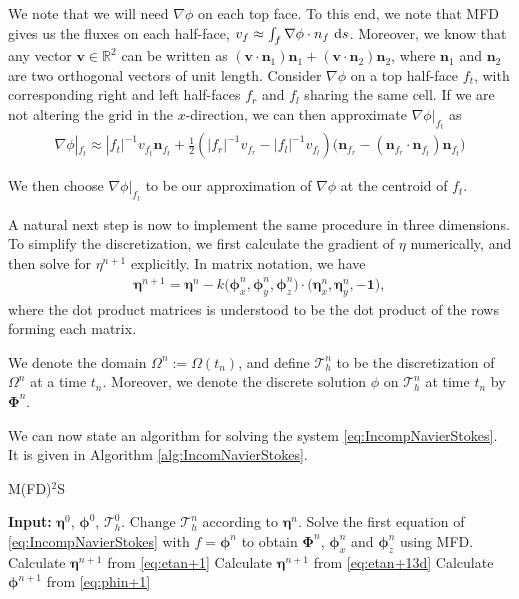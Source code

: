 \documentclass[11pt]{article}
\begin{document}
We note that we will need $\nabla \phi$ on each top face. To this end, we note that MFD gives us the fluxes on each half-face, $v_{f} \approx \int_{f} \nabla \phi \cdot n_{f} \, \operatorname{d}\! s$.
Moreover, we know that any vector $\bm{v} \in \mathbb{R}^2$ can be written as $(\bm{v}\cdot\bm{n}_1) \bm{n}_1 + (\bm{v}\cdot\bm{n}_2) \bm{n}_2$,
where $\bm{n}_1$ and $\bm{n}_2$ are two orthogonal vectors of unit length.
Consider $\nabla \phi$ on a top half-face $f_t$, with corresponding right and left half-faces $f_r$ and $f_l$ sharing the same cell.
If we are not altering the grid in the $x$-direction, we can then approximate $\nabla \phi|_{f_t}$ as
\begin{align*}
    \nabla \phi|_{f_t} \approx |f_t|^{-1} v_{f_t} \bm{n}_{f_t} + \frac{1}{2}(|f_r|^{-1}v_{f_r}-|f_l|^{-1}v_{f_l})\big(\bm{n}_{f_r} - (\bm{n}_{f_r} \cdot \bm{n}_{f_t})\bm{n}_{f_t}\big)
\end{align*}

We then choose $\nabla \phi|_{f_t}$ to be our approximation of $\nabla \phi$ at the centroid of $f_t$.

A natural next step is now to implement the same procedure in three dimensions. To simplify the discretization, we first calculate
the gradient of $\eta$ numerically, and then solve for $\eta^{n+1}$ explicitly. In matrix notation, we have
\begin{align}
    \label{eq:etan+13d}
    \bm{\eta}^{n+1} = \bm{\eta}^n - k \big(\bm{\phi}_x^n, \bm{\phi}_y^n, \bm{\phi}_z^n\big)\cdot(\bm{\eta}_x^n, \bm{\eta}_y^n, -\bm{1}\big),
\end{align}
where the dot product matrices is understood to be the dot product of the rows forming each matrix.

We denote the domain $\Omega^n := \Omega(t_n)$, and define $\mathcal{T}_h^n$ to be the discretization of $\Omega^n$
at a time $t_n$. Moreover, we denote the discrete solution $\phi$ on $\mathcal{T}_h^n$ at time $t_n$ by $\bm{\Phi}^n$.

We can now state an algorithm for solving the system \eqref{eq:IncompNavierStokes}. It is given in Algorithm \eqref{alg:IncomNavierStokes}.
%
%
\begin{algorithm}
    \caption{M(FD)$^2$S}
    \begin{algorithmic}[1]
    \State    \textbf{Input:} $\bm{\eta}^0$, $\bm{\phi}^0$, $\mathcal{T}_h^0$.
	    \State    Change $\mathcal{T}_h^n$ according to $\bm{\eta}^n$.
            \State    Solve the first equation of \eqref{eq:IncompNavierStokes} with $f = \bm{\phi}^n$ to obtain
                      $\bm{\Phi}^{n}$, $\bm{\phi}_x^n$ and $\bm{\phi}_z^n$ using MFD.
                \State    Calculate $\bm{\eta}^{n+1}$ from \eqref{eq:etan+1}
			    \State    Calculate $\bm{\eta}^{n+1}$ from \eqref{eq:etan+13d}
			\EndIf
        \State    Calculate $\bm{\phi}^{n+1}$ from \eqref{eq:phin+1}
        \EndFor
	\end{algorithmic}
	\label{alg:IncomNavierStokes}
\end{algorithm}
%
%
\end{document}
